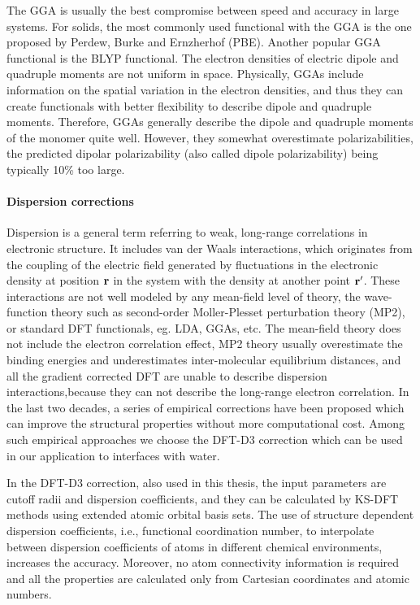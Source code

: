 The GGA is usually the best compromise between speed and accuracy in large systems. For solids, the most commonly used functional
with the GGA is the one proposed by Perdew, Burke and Ernzherhof (PBE)\cite{PBE96}.
Another popular GGA functional is the BLYP functional.  
The electron densities of electric dipole and quadruple moments are not uniform in space.
Physically, GGAs include information on the spatial variation in the electron densities,
and thus they can create functionals with better flexibility to describe dipole and quadruple moments. 
Therefore, GGAs generally describe the dipole and quadruple moments of the monomer quite well. 
However, they somewhat overestimate polarizabilities, the predicted dipolar 
polarizability (also called dipole polarizability) being typically 10\% too large.

\paragraph{Dispersion corrections}
Dispersion is a general term referring to weak, long-range correlations in electronic structure. It includes van der Waals interactions,
which originates from the coupling of the electric field generated by fluctuations in the electronic density at position $\bf{r}$ 
in the system with the density at another point $\bf{r'}$\cite{Zeiss1977,Kohanoff06}. These interactions are not well modeled by any mean-field level of theory, 
the \abinitio wave-function theory such as second-order M{o}ller-Plesset perturbation theory (MP2), 
or standard DFT functionals, eg. LDA, GGAs, etc. 
The mean-field theory does not include the electron correlation effect, MP2 theory usually overestimate the binding energies 
and underestimates inter-molecular equilibrium distances, and all the gradient corrected DFT are unable to describe dispersion 
interactions,because they can not describe the long-range electron correlation.
In the last two decades, a series of empirical corrections have been proposed which can improve the structural properties 
without more computational cost\cite{WuX2001,WuQ2002,Zimmerli2004,Grimme2004,Grimme2006,Grimme2007,Grimme2010}.
Among such empirical approaches we  choose the DFT-D3 correction which can be used in our application to interfaces with water\cite{Grimme2010,Klimes2012}.

In the DFT-D3 correction, also used in this thesis, the input parameters are cutoff radii and dispersion coefficients, and they can be calculated by 
KS-DFT methods using extended atomic orbital basis sets. The use of structure dependent dispersion coefficients, 
i.e., functional coordination number, to interpolate between dispersion coefficients of atoms in different chemical environments, 
increases the accuracy.  Moreover, no atom connectivity information is required and all the properties are calculated only 
from Cartesian coordinates and atomic numbers\cite{Grimme2010}.

